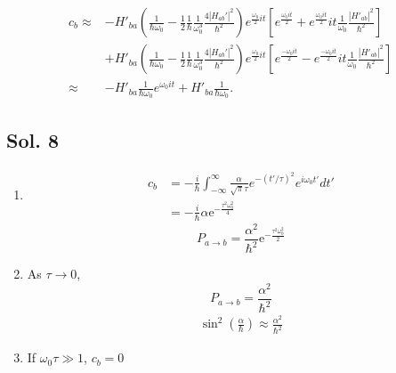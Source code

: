 \begin{align*}
    c_b     \approx & -H'_{ba}\left(
    \frac{1}{\hbar \omega_0}
    - \frac{1}{2}\frac{1}{\hbar}\frac{1}{\omega_0^3}
    \frac{4|H_{ab}'|^2}{\hbar^2}
    \right)e^{\frac{\omega_0}{2}it}
    \left[e^{\frac{\omega_0 it}{2}}
        +e^{\frac{\omega_0 it}{2}}it\frac{1}{\omega_0}\frac{|H'_{ab}|^2}{\hbar^2}\right] \\
                    & +
    H'_{ba}\left(
    \frac{1}{\hbar \omega_0}
    - \frac{1}{2}\frac{1}{\hbar}\frac{1}{\omega_0^3}
    \frac{4|H_{ab}'|^2}{\hbar^2}
    \right)e^{\frac{\omega_0}{2}it}
    \left[e^{\frac{-\omega_0 it}{2}}
        -e^{\frac{-\omega_0 it}{2}}it\frac{1}{\omega_0}\frac{|H'_{ab}|^2}{\hbar^2}\right] \\
    \approx         &
    -H'_{ba} \frac{1}{\hbar\omega_0}e^{\omega_0 it}
    +H'_{ba} \frac{1}{\hbar\omega_0}.
\end{align*}

\subsection*{Sol. 8}
\begin{enumerate}
    \item
          \begin{align*}
              c_b & =-\frac{i}{\hbar}
              \int_{-\infty}^\infty\frac{\alpha}{\sqrt{\pi}\tau}e^{-(t'/\tau)^2}
              e^{i\omega_0t'}dt' \\
                  & =-\frac{i}{\hbar}
                      {\alpha}\mathrm{e}^{-\frac{{\tau}^{2} {\omega}_{0}^{2}}{4}}
          \end{align*}
          $$
              P_{a\to b}
              =
              \frac{\alpha^2}{\hbar^2}
              \mathrm{e}^{-\frac{{\tau}^{2} {\omega}_{0}^{2}}{2}}
          $$
    \item As $\tau\to 0$, $$
              P_{a\to b} = \frac{\alpha^2}{\hbar^2}
          $$
          \begin{align*}
              \sin^2(\frac{\alpha}{\hbar})\approx\frac{\alpha^2}{\hbar^2}
          \end{align*}
    \item If $\omega_0\tau \gg 1$, $c_b = 0$
\end{enumerate}
